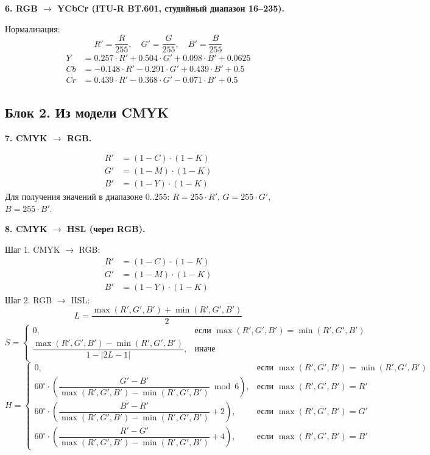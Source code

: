 \documentclass[12pt,a4paper]{article}
\begin{document}
\textbf{6. RGB \(\to\) YCbCr (ITU-R BT.601, студийный диапазон 16--235).}

Нормализация:
\[
R' = \frac{R}{255},\quad G' = \frac{G}{255},\quad B' = \frac{B}{255}
\]
\begin{align*}
Y &= 0.257 \cdot R' + 0.504 \cdot G' + 0.098 \cdot B' + 0.0625 \\
Cb &= -0.148 \cdot R' - 0.291 \cdot G' + 0.439 \cdot B' + 0.5 \\
Cr &= 0.439 \cdot R' - 0.368 \cdot G' - 0.071 \cdot B' + 0.5
\end{align*}

\subsection{Блок 2. Из модели CMYK}

\textbf{7. CMYK \(\to\) RGB.}

\begin{align*}
R' &= (1 - C) \cdot (1 - K) \\
G' &= (1 - M) \cdot (1 - K) \\
B' &= (1 - Y) \cdot (1 - K)
\end{align*}
Для получения значений в диапазоне \(0..255\): \(R = 255 \cdot R'\), \(G = 255 \cdot  G'\), \(B = 255 \cdot B'\).

\textbf{8. CMYK \(\to\) HSL (через RGB).}

Шаг 1. CMYK \(\to\) RGB:
\begin{align*}
R' &= (1 - C) \cdot (1 - K) \\
G' &= (1 - M) \cdot (1 - K) \\
B' &= (1 - Y) \cdot (1 - K)
\end{align*}
Шаг 2. RGB \(\to\) HSL:
\[
L = \frac{\max(R', G', B') + \min(R', G', B')}{2}
\]
\[
S = \begin{cases}
0, & \text{если } \max(R', G', B') = \min(R', G', B') \\[8pt]
\dfrac{\max(R', G', B') - \min(R', G', B')}{1 - |2L - 1|}, & \text{иначе}
\end{cases}
\]
\[
H = \begin{cases}
0, & \text{если } \max(R', G', B') = \min(R', G', B') \\[8pt]
60^\circ \cdot \left( \dfrac{G' - B'}{\max(R', G', B') - \min(R', G', B')} \bmod 6 \right), & \text{если } \max(R', G', B') = R' \\[12pt]
60^\circ \cdot \left( \dfrac{B' - R'}{\max(R', G', B') - \min(R', G', B')} + 2 \right), & \text{если } \max(R', G', B') = G' \\[12pt]
60^\circ \cdot \left( \dfrac{R' - G'}{\max(R', G', B') - \min(R', G', B')} + 4 \right), & \text{если } \max(R', G', B') = B'
\end{cases}
\]
\end{document}
